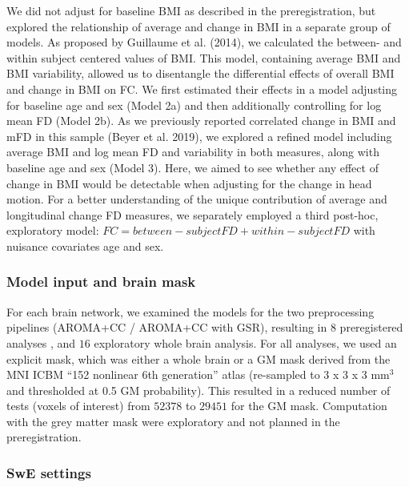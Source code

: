 \documentclass[
]{article}
\begin{document}
We did not adjust for baseline BMI as described in the preregistration, but explored the relationship of average and change in BMI in a separate group of models.
As proposed by Guillaume et al. (2014), we calculated the between- and within subject centered values of BMI. This model, containing average BMI and BMI variability, allowed us to disentangle the differential effects of overall BMI and change in BMI on FC. We first estimated their effects in a model adjusting for baseline age and sex (Model 2a) and then additionally controlling for log mean FD (Model 2b).
As we previously reported correlated change in BMI and mFD in this sample (Beyer et al. 2019), we explored a refined model including average BMI and log mean FD and variability in both measures, along with baseline age and sex (Model 3). Here, we aimed to see whether any effect of change in BMI would be detectable when adjusting for the change in head motion.
For a better understanding of the unique contribution of average and longitudinal change FD measures, we separately employed a third post-hoc, exploratory model: \(FC = between-subject FD + within-subject FD\) with nuisance covariates age and sex.

\hypertarget{model-input-and-brain-mask}{%
\subsubsection{Model input and brain mask}\label{model-input-and-brain-mask}}

For each brain network, we examined the models for the two preprocessing pipelines (AROMA+CC / AROMA+CC with GSR), resulting in \(8\) preregistered analyses , and \(16\) exploratory whole brain analysis.
For all analyses, we used an explicit mask, which was either a whole brain or a GM mask derived from the MNI ICBM ``152 nonlinear 6th generation'' atlas (re-sampled to 3 x 3 x 3 mm\(^3\) and thresholded at 0.5 GM probability). This resulted in a reduced number of tests (voxels of interest) from \(52378\) to \(29451\) for the GM mask.
Computation with the grey matter mask were exploratory and not planned in the preregistration.

\hypertarget{swe-settings}{%
\subsubsection{SwE settings}\label{swe-settings}}
\end{document}
